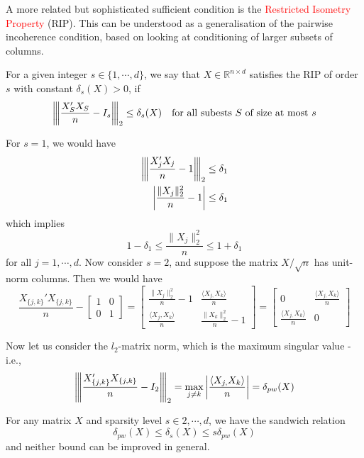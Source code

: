 \documentclass[10pt,handout,english]{beamer}
\newcommand{\R}{\mathbb{R}}
\newcommand{\vertiii}[1]{{\left\vert\kern-0.25ex\left\vert\kern-0.25ex\left\vert #1 
    \right\vert\kern-0.25ex\right\vert\kern-0.25ex\right\vert}}
\begin{document}
\begin{frame}[allowframebreaks]
A more related but sophisticated sufficient condition is the \textcolor{red}{Restricted Isometry Property} (RIP). This can be understood as a generalisation of the pairwise incoherence condition, based on looking at conditioning of larger subsets of columns.

\begin{definition}

For a given integer $s\in\{1,\cdots,d\}$, we say that $X\in\R^{n\times d}$ satisfies the RIP of order $s$ with constant $\delta_{s}(X)>0$, if 
\[
\vertiii{\frac{X_{S}'X_{S}}{n}-I_{s}}_{2}\leq\delta_{s}(X)\quad\text{for all subests \ensuremath{S} of size at most \ensuremath{s}}
\]
\end{definition}

For $s=1$, we would have 
\begin{align*}
\vertiii{\frac{X_{j}'X_{j}}{n}-1}_{2}&\leq\delta_{1}\\
\left\lvert\frac{\lVert X_{j}\rVert_{2}^{2}}{n}-1\right\rvert&\leq\delta_{1}
\end{align*}
which implies 
\[
1-\delta_{1}\leq\frac{\lVert X_{j}\rVert_{2}^{2}}{n}\leq1+\delta_{1}
\]
for all $j=1,\cdots,d$. Now consider $s=2$, and suppose the matrix $X/\sqrt{n}$ has unit-norm columns. Then we would have
\[
\frac{X_{\{j,k\}}'X_{\{j,k\}}}{n}-\begin{bmatrix}1 & 0\\
0 & 1
\end{bmatrix}=\begin{bmatrix}\frac{\lVert X_{j}\rVert_{2}^{2}}{n}-1 & \frac{\langle X_{j,}X_{k}\rangle}{n}\\
\frac{\langle X_{j},X_{k}\rangle}{n} & \frac{\lVert X_{k}\rVert_{2}^{2}}{n}-1
\end{bmatrix}=\begin{bmatrix}0 & \frac{\langle X_{j,}X_{k}\rangle}{n}\\
\frac{\langle X_{j,}X_{k}\rangle}{n} & 0
\end{bmatrix}
\]

Now let us consider the $l_{2}$-matrix norm, which is the maximum singular value - i.e.,
\[
\vertiii{\frac{X_{\{j,k\}}'X_{\{j,k\}}}{n}-I_{2}}_{2}=\max_{j\neq k}\left\lvert\frac{\langle X_{j,}X_{k}\rangle}{n}\right\rvert=\delta_{pw}(X)
\]
\begin{definition}

For any matrix $X$ and sparsity level $s\in{2,\cdots,d}$, we have the sandwich relation
\[
\delta_{pw}(X)\leq\delta_{s}(X)\leq s\delta_{pw}(X)
\]
and neither bound can be improved in general.


\end{definition}
\end{frame}
\end{document}
